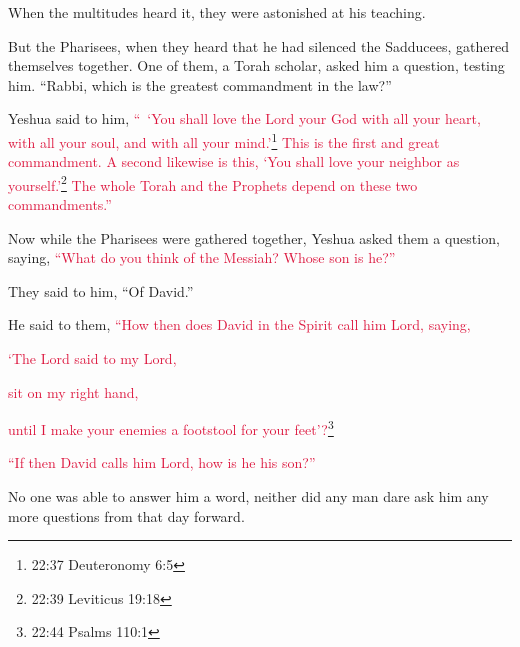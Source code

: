 \myverse{}When the multitudes heard it, they were astonished at his teaching.

\myverse{}But the Pharisees, when they heard that he had silenced the
Sadducees, gathered themselves together.
\myverse{}One of them, a Torah scholar, asked him a question, testing him.
\myverse{}“Rabbi, which is the greatest commandment in the law?”

\myverse{}Yeshua said to him,
\textcolor{crimson}{“ ‘You shall love the Lord your God with all your heart, with all your soul, and with all your mind.’}\footnote{22:37 Deuteronomy 6:5
}
\myverse{}\textcolor{crimson}{This is the first and great commandment.
}
\myverse{}\textcolor{crimson}{A second likewise is this, ‘You shall love your neighbor as yourself.’}\footnote{22:39 Leviticus 19:18}
\myverse{}\textcolor{crimson}{The whole Torah and the Prophets depend on these two commandments.”
}

\myverse{}Now while the Pharisees were gathered together, Yeshua asked
them a question,
\myverse{}saying,
\textcolor{crimson}{“What do you think of the Messiah? Whose son is he?”
}

They said to him, “Of David.”

\myverse{}He said to them,
\textcolor{crimson}{“How then does David in the Spirit call him Lord, saying,}

\myverse{}\textcolor{crimson}{‘The Lord said to my Lord,}

\textcolor{crimson}{sit on my right hand,}

\textcolor{crimson}{until I make your enemies a footstool for your feet’?}\footnote{22:44 Psalms 110:1}

\myverse{}\textcolor{crimson}{“If then David calls him Lord, how is he his son?”}

\myverse{}No one was able to answer him a word, neither did any man dare
ask him any more questions from that day forward.


